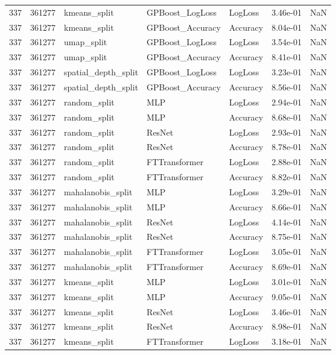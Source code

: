 \begin{tabular}{rrlllrr}
337 & 361277 & kmeans\_split & GPBoost\_LogLoss & LogLoss & 3.46e-01 & NaN \\
337 & 361277 & kmeans\_split & GPBoost\_Accuracy & Accuracy & 8.04e-01 & NaN \\
337 & 361277 & umap\_split & GPBoost\_LogLoss & LogLoss & 3.54e-01 & NaN \\
337 & 361277 & umap\_split & GPBoost\_Accuracy & Accuracy & 8.41e-01 & NaN \\
337 & 361277 & spatial\_depth\_split & GPBoost\_LogLoss & LogLoss & 3.23e-01 & NaN \\
337 & 361277 & spatial\_depth\_split & GPBoost\_Accuracy & Accuracy & 8.56e-01 & NaN \\
337 & 361277 & random\_split & MLP & LogLoss & 2.94e-01 & NaN \\
337 & 361277 & random\_split & MLP & Accuracy & 8.68e-01 & NaN \\
337 & 361277 & random\_split & ResNet & LogLoss & 2.93e-01 & NaN \\
337 & 361277 & random\_split & ResNet & Accuracy & 8.78e-01 & NaN \\
337 & 361277 & random\_split & FTTransformer & LogLoss & 2.88e-01 & NaN \\
337 & 361277 & random\_split & FTTransformer & Accuracy & 8.82e-01 & NaN \\
337 & 361277 & mahalanobis\_split & MLP & LogLoss & 3.29e-01 & NaN \\
337 & 361277 & mahalanobis\_split & MLP & Accuracy & 8.66e-01 & NaN \\
337 & 361277 & mahalanobis\_split & ResNet & LogLoss & 4.14e-01 & NaN \\
337 & 361277 & mahalanobis\_split & ResNet & Accuracy & 8.75e-01 & NaN \\
337 & 361277 & mahalanobis\_split & FTTransformer & LogLoss & 3.05e-01 & NaN \\
337 & 361277 & mahalanobis\_split & FTTransformer & Accuracy & 8.69e-01 & NaN \\
337 & 361277 & kmeans\_split & MLP & LogLoss & 3.01e-01 & NaN \\
337 & 361277 & kmeans\_split & MLP & Accuracy & 9.05e-01 & NaN \\
337 & 361277 & kmeans\_split & ResNet & LogLoss & 3.46e-01 & NaN \\
337 & 361277 & kmeans\_split & ResNet & Accuracy & 8.98e-01 & NaN \\
337 & 361277 & kmeans\_split & FTTransformer & LogLoss & 3.18e-01 & NaN \\

\end{tabular}
